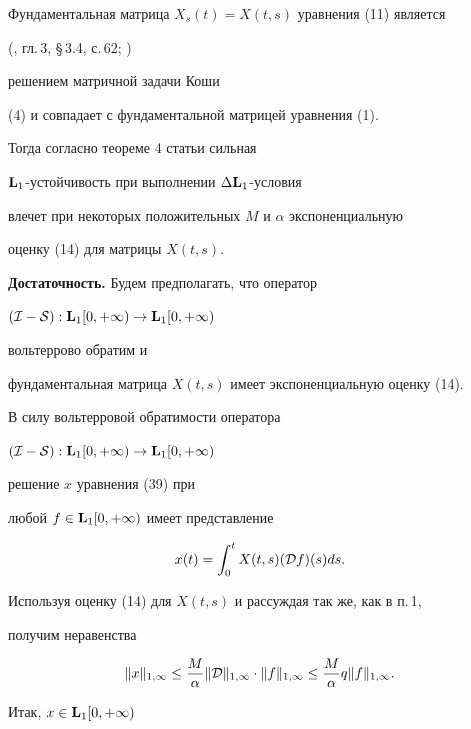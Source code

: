 Фундаментальная матрица $X_s(t)=X(t,s)$ уравнения (11) является


(\cite{Az1}, гл.\,3, \S\,3.4, с.\,62; \cite{Mak})


решением матричной задачи Коши


(4) и совпадает с фундаментальной матрицей уравнения (1).





Тогда согласно теореме 4 статьи \cite{Az2} сильная 


$\bold L_1$-устойчивость при выполнении $\Delta\bold L_1$-условия


влечет при некоторых положительных $M$ и $\alpha$ экспоненциальную


оценку (14) для матрицы $X(t,s)$.





{\bf Достаточность.} Будем предполагать, что оператор 


$({\cal I-S}):\bold L_1[0,+\infty)\to\bold L_1[0,+\infty)$


вольтеррово обратим и


фундаментальная матрица $X(t,s)$ имеет экспоненциальную оценку (14).





В силу вольтерровой обратимости оператора 


$({\cal I-S}):\bold L_1[0,+\infty)\to\bold L_1[0,+\infty)$


решение $x$ уравнения (39) при


любой $f\in\bold L_1[0,+\infty)$ имеет представление \cite{Mak}


$$


x(t)=\int_0^tX(t,s)({\cal D}f)(s)ds.


$$





Используя оценку (14) для $X(t,s)$ и рассуждая так же, как в п.\,1,


получим неравенства


$$


\|x\|_{1,\infty}\le\frac{M}{\alpha}\|{\cal D}\|_{1,\infty}\cdot\|f\|_{1,


\infty}\le\frac{M}{\alpha}q\|f\|_{1,\infty}.


$$





Итак, $x\in\bold L_1[0,+\infty)$


